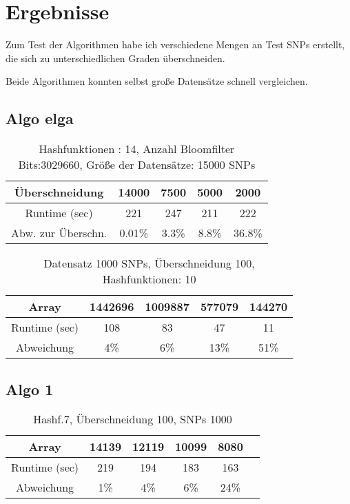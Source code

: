 \chapter{Ergebnisse}

Zum Test der Algorithmen habe ich verschiedene Mengen an Test SNPs erstellt, die sich zu unterschiedlichen Graden überschneiden.


Beide Algorithmen konnten selbst große Datensätze schnell vergleichen.

\section{Algo elga}

 \begin{table}[h]
 	\begin{tabular}{c|c|c|c|c}
 		Überschneidung&14000&7500&5000&2000\\
 		\hline
 		Runtime (sec)& 221&247&211&222\\
 		Abw. zur Überschn.& 0.01\%& 3.3\%&8.8\%&36.8\%\\
 		
 	\end{tabular}
 	\caption{Hashfunktionen : 14, Anzahl Bloomfilter Bits:3029660, Größe der Datensätze: 15000 SNPs }
 	\label{tab:meinetabelle1}
 	
 	
 \end{table}
 
 \begin{table}[h]
 	
 	\begin{tabular}{c|c|c|c|c}
 		Array& 1442696&1009887&577079&144270\\
 		\hline
 		Runtime (sec)& 108&83&47&11\\
 		Abweichung&4\%&6\%&13\%&51\%\\
 		
 		
 	\end{tabular}
 	\caption{Datensatz 1000 SNPs, Überschneidung 100, Hashfunktionen: 10 }
 	\label{tab:meinetabelle2}
 \end{table}
\section{Algo 1}

	\begin{table}[h]
		
		\begin{tabular}{c|c|c|c|c|c}
			Array&14139&12119&10099&8080\\
			\hline
			Runtime (sec)&219&194&183&163\\
			Abweichung&1\%&4\%&6\%&24\%\\
			
			
		\end{tabular}
		\caption{Hashf.7, Überschneidung 100, SNPs 1000 }
		\label{tab:meinetabelle5}
	\end{table}